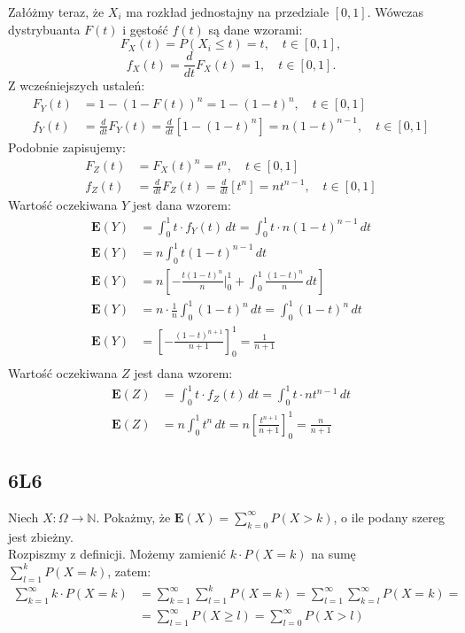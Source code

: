 \documentclass{article}
\begin{document}
Załóżmy teraz, że $X_i$ ma rozkład jednostajny na przedziale $[0,1]$. Wówczas dystrybuanta \( F(t) \) i gęstość \( f(t) \) są dane wzorami:
\[
F_X(t) = P(X_i \leq t) = t, \quad t \in [0, 1],
\]
\[
f_X(t) = \frac{d}{dt} F_X(t) = 1, \quad t \in [0, 1].
\]
Z wcześniejszych ustaleń:
\begin{align}
F_Y(t) &= 1 - (1 - F(t))^n = 1 - (1 - t)^n, \quad t \in [0, 1]\\
f_Y(t) &= \frac{d}{dt} F_Y(t) = \frac{d}{dt} \left[1 - (1 - t)^n\right] = n(1 - t)^{n-1}, \quad t \in [0, 1]
\end{align}
Podobnie zapisujemy:
\begin{align}
F_Z(t) &= F_X(t)^n = t^n, \quad t \in [0, 1]\\
f_Z(t) &= \frac{d}{dt} F_Z(t) = \frac{d}{dt} \left[t^n\right] = n t^{n-1}, \quad t \in [0, 1]
\end{align}
Wartość oczekiwana \( Y \) jest dana wzorem:
\begin{align}
    \mathbf{E}(Y) &= \int_0^1 t \cdot f_Y(t) \, dt = \int_0^1 t \cdot n(1 - t)^{n-1} \, dt\\
    \mathbf{E}(Y) &= n \int_0^1 t (1 - t)^{n-1} \, dt\\
    \mathbf{E}(Y) &= n \left[ -\frac{t (1 - t)^n}{n} \bigg|_0^1 + \int_0^1 \frac{(1 - t)^n}{n} \, dt \right]\\
    \mathbf{E}(Y) &= n \cdot \frac{1}{n} \int_0^1 (1 - t)^n \, dt = \int_0^1 (1 - t)^n \, dt\\
    \mathbf{E}(Y) &= \left[ -\frac{(1 - t)^{n+1}}{n+1} \right]_0^1 = \frac{1}{n+1}\\
\end{align}
Wartość oczekiwana \( Z \) jest dana wzorem:
\begin{align}
    \mathbf{E}(Z) &= \int_0^1 t \cdot f_Z(t) \, dt = \int_0^1 t \cdot n t^{n-1} \, dt\\
    \mathbf{E}(Z) &= n \int_0^1 t^n \, dt = n \left[ \frac{t^{n+1}}{n+1} \right]_0^1 = \frac{n}{n+1}
\end{align}

\subsection{6L6}

Niech $X: \Omega \rightarrow \mathbb{N}$. Pokażmy, że $\mathbf{E}(X)=\sum_{k=0}^{\infty} P(X>k)$, o ile podany szereg jest zbieżny.\\

\noindent
Rozpiszmy z definicji. Możemy zamienić $k\cdot P(X=k)$ na sumę $\sum_{l=1}^{k} P(X=k)$, zatem:
\setcounter{equation}{0}
\begin{align}
    \sum_{k=1}^{\infty} k\cdot P(X=k) 
    &= \sum_{k=1}^{\infty} \sum_{l=1}^{k} P(X=k) 
    = \sum_{l=1}^{\infty} \sum_{k=l}^{\infty} P(X = k) =\\
    &= \sum_{l=1}^{\infty} P(X \geq l) 
    = \sum_{l=0}^{\infty} P(X > l) 
\end{align}
\end{document}
